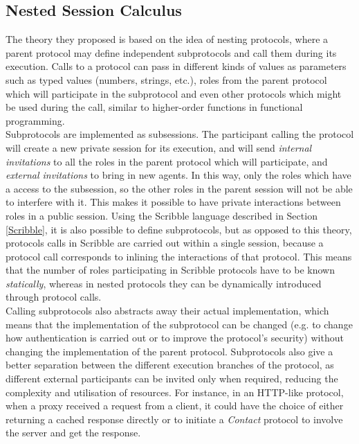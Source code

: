 \documentclass[12pt,twoside]{report}
\begin{document}
\subsection{Nested Session Calculus}
The theory they proposed is based on the idea of nesting protocols, where a parent protocol may define independent subprotocols and call them during its execution. Calls to a protocol can pass in different kinds of values as parameters such as typed values (numbers, strings, etc.), roles from the parent protocol which will participate in the subprotocol and even other protocols which might be used during the call, similar to higher-order functions in functional programming.\\ 

Subprotocols are implemented as subsessions. The participant calling the protocol will create a new private session for its execution, and will send \textit{internal invitations} to all the roles in the parent protocol which will participate, and \textit{external invitations} to bring in new agents. In this way, only the roles which have a access to the subsession, so the other roles in the parent session will not be able to interfere with it. This makes it possible to have private interactions between roles in a public session. Using the Scribble language described in Section \ref{Scribble}, it is also possible to define subprotocols, but as opposed to this theory, protocols calls in Scribble are carried out within a single session, because a protocol call corresponds to inlining the interactions of that protocol. This means that the number of roles participating in Scribble protocols have to be known \textit{statically}, whereas in nested protocols they can be dynamically introduced through protocol calls.\\

Calling subprotocols also abstracts away their actual implementation, which means that the implementation of the subprotocol can be changed (e.g. to change how authentication is carried out or to improve the protocol's security) without changing the implementation of the parent protocol. Subprotocols also give a better separation between the different execution branches of the protocol, as different external participants can be invited only when required, reducing the complexity and utilisation of resources. For instance, in an HTTP-like protocol, when a proxy received a request from a client, it could have the choice of either returning a cached response directly or to initiate a \textit{Contact} protocol to involve the server and get the response. \\
\end{document}
